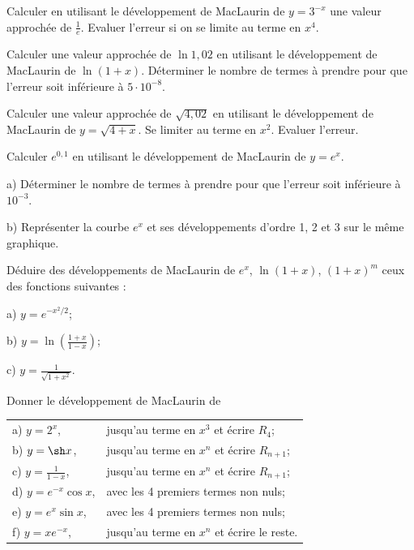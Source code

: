 \documentclass[12pt,french,oneside,a4paper]{memoir} %
\begin{document}
\begin{exo}
Calculer en utilisant le développement de MacLaurin de
$y=3^{-x}$ une valeur approchée de $\displaystyle{\frac{1}{e}}$.
Evaluer l'erreur si on se limite au terme en $x^4$.
\end{exo}
\begin{exo}
Calculer une valeur approchée de $\ln 1{,}02$ en
utilisant le développement de MacLaurin de $\ln(1+x)$.
Déterminer le nombre de termes à prendre pour que l'erreur soit
inférieure à $5\cdot10^{-8}$.
\end{exo}
\begin{exo}
Calculer une valeur approchée de $\sqrt{4{,}02}$ en
utilisant le développement de MacLaurin de $y=\sqrt{4+x}$. Se
limiter au terme en $x^2$. Evaluer l'erreur.
\end{exo}
\begin{exo}
Calculer $e^{0{,}1}$ en utilisant le développement de
MacLaurin de $y=e^x$.

a) Déterminer le nombre de termes à prendre pour que l'erreur
soit inférieure à $10^{-3}$.

b) Représenter la courbe $e^x$ et ses développements d'ordre 1,
2 et 3 sur le même graphique.
\end{exo}
\begin{exo}
Déduire des développements de MacLaurin de $e^x$,
$\ln(1+x)$, $(1+x)^m$ ceux des fonctions suivantes :

a) $\displaystyle{y=e^{-x^2/2}}$;

b) $\displaystyle{y=\ln(\frac{1+x}{1-x})}$;

c) $\displaystyle{y=\frac{1}{\sqrt{1+x^2}}}$.
\end{exo}
\begin{exo}
Donner le développement de MacLaurin de

\begin{tabular}{ll}

a) $y=2^x$, &jusqu'au terme en $x^3$ et écrire $R_4$;\\
b) $y=\sh x$, &jusqu'au terme en $x^n$ et écrire
$R_{n+1}$;\\
c) $\displaystyle{y=\frac{1}{1-x}}$, 
&jusqu'au terme en $x^n$ et écrire
$R_{n+1}$;\\
d) $y=e^{-x}\cos x$, &avec les 4 premiers termes non nuls;\\
e) $y=e^x\sin x$, &avec les 4 premiers termes non nuls;\\
f) $y=xe^{-x}$, &jusqu'au terme en $x^n$ et écrire le reste.
\end{tabular}
\end{exo}
\end{document}
